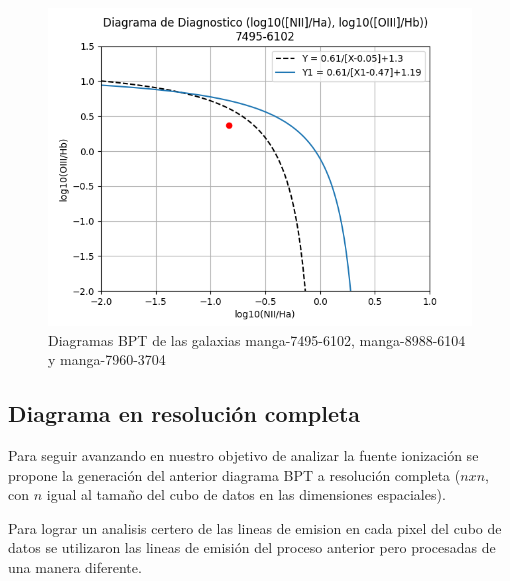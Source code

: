 \documentclass[10pt,twocolumn,a4paper]{opticajnl}
\begin{document}
\begin{figure}[h!]
    \includegraphics[width=1\linewidth]{../Codigos/diagramasDeDiagnostico/diagrama7495-6102.png}
    \caption{Diagramas BPT de las galaxias manga-7495-6102, manga-8988-6104 y manga-7960-3704}
    \label{fig:recent_files}
\end{figure}


\subsection*{Diagrama en resolución completa}
Para seguir avanzando en nuestro objetivo de analizar la fuente ionización se propone la generación del anterior diagrama BPT a resolución completa ($nxn$, con $n$ igual al tamaño del cubo de datos en las dimensiones espaciales).

Para lograr un analisis certero de las lineas de emision en cada pixel del cubo de datos se utilizaron las lineas de emisión del proceso anterior pero procesadas de una manera diferente.
\end{document}
